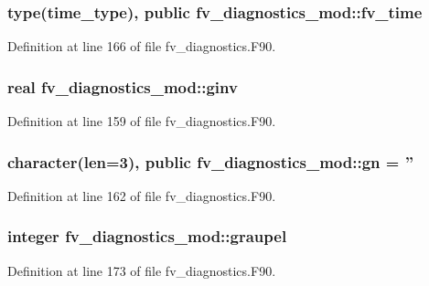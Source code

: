 \subsubsection[{fv\-\_\-time}]{\setlength{\rightskip}{0pt plus 5cm}type(time\-\_\-type), public fv\-\_\-diagnostics\-\_\-mod\-::fv\-\_\-time}\label{classfv__diagnostics__mod_ad47b1fcfcd29f3dc6009a3a52208a573}


Definition at line 166 of file fv\-\_\-diagnostics.\-F90.

\subsubsection[{ginv}]{\setlength{\rightskip}{0pt plus 5cm}real fv\-\_\-diagnostics\-\_\-mod\-::ginv\hspace{0.3cm}{\ttfamily [private]}}\label{classfv__diagnostics__mod_af69e1742e47bc565a4a6e3a436ccb3ea}


Definition at line 159 of file fv\-\_\-diagnostics.\-F90.

\subsubsection[{gn}]{\setlength{\rightskip}{0pt plus 5cm}character(len=3), public fv\-\_\-diagnostics\-\_\-mod\-::gn = ''}\label{classfv__diagnostics__mod_a6163da8e2b1f43bc8bd4a34782803687}


Definition at line 162 of file fv\-\_\-diagnostics.\-F90.

\subsubsection[{graupel}]{\setlength{\rightskip}{0pt plus 5cm}integer fv\-\_\-diagnostics\-\_\-mod\-::graupel\hspace{0.3cm}{\ttfamily [private]}}\label{classfv__diagnostics__mod_abaf055458b50aae94a987c4310f35a5e}


Definition at line 173 of file fv\-\_\-diagnostics.\-F90.

